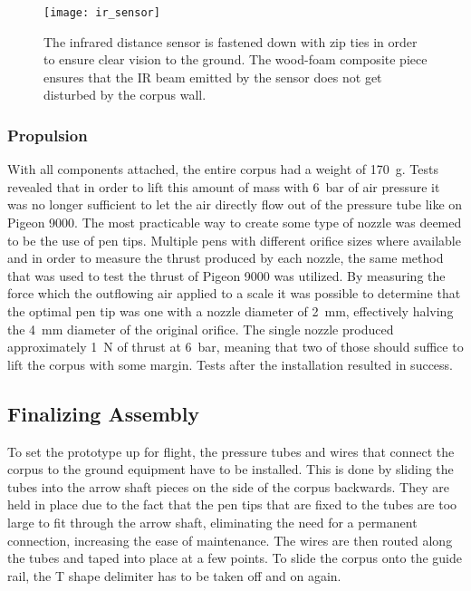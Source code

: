 \begin{figure}[H]
\centering

\texttt{[image: ir\_sensor]}

\caption{The infrared distance sensor is fastened down with zip ties in order to ensure clear vision to the ground. The wood-foam composite piece ensures that the IR beam emitted by the sensor does not get disturbed by the corpus wall.}
\end{figure}

\subsubsection{Propulsion}

With all components attached, the entire corpus had a weight of \SI{170}{\gram}. Tests revealed that in order to lift this amount of mass with \SI{6}{\bar} of air pressure it was no longer sufficient to let the air directly flow out of the pressure tube like on Pigeon 9000. The most practicable way to create some type of nozzle was deemed to be the use of pen tips. Multiple pens with different orifice sizes where available and in order to measure the thrust produced by each nozzle, the same method that was used to test the thrust of Pigeon 9000 was utilized. By measuring the force which the outflowing air applied to a scale it was possible to determine that the optimal pen tip was one with a nozzle diameter of \SI{2}{\milli\meter}, effectively halving the \SI{4}{\milli\meter} diameter of the original orifice. The single nozzle produced approximately \SI{1}{\newton} of thrust at \SI{6}{\bar}, meaning that two of those should suffice to lift the corpus with some margin. Tests after the installation resulted in success.


\subsection{Finalizing Assembly}
\author{Philip Trauner}

To set the prototype up for flight, the pressure tubes and wires that connect the corpus to the ground equipment have to be installed. This is done by sliding the tubes into the arrow shaft pieces on the side of the corpus backwards. They are held in place due to the fact that the pen tips that are fixed to the tubes are too large to fit through the arrow shaft, eliminating the need for a permanent connection, increasing the ease of maintenance. The wires are then routed along the tubes and taped into place at a few points. To slide the corpus onto the guide rail, the T shape delimiter has to be taken off and on again.

